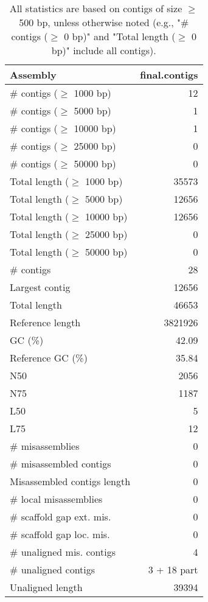 \documentclass[12pt,a4paper]{article}
\begin{document}
\begin{table}[ht]
\begin{center}
\caption{All statistics are based on contigs of size $\geq$ 500 bp, unless otherwise noted (e.g., "\# contigs ($\geq$ 0 bp)" and "Total length ($\geq$ 0 bp)" include all contigs).}
\begin{tabular}{|l*{1}{|r}|}
\hline
Assembly & final.contigs \\ \hline
\# contigs ($\geq$ 1000 bp) & 12 \\ \hline
\# contigs ($\geq$ 5000 bp) & 1 \\ \hline
\# contigs ($\geq$ 10000 bp) & 1 \\ \hline
\# contigs ($\geq$ 25000 bp) & 0 \\ \hline
\# contigs ($\geq$ 50000 bp) & 0 \\ \hline
Total length ($\geq$ 1000 bp) & 35573 \\ \hline
Total length ($\geq$ 5000 bp) & 12656 \\ \hline
Total length ($\geq$ 10000 bp) & 12656 \\ \hline
Total length ($\geq$ 25000 bp) & 0 \\ \hline
Total length ($\geq$ 50000 bp) & 0 \\ \hline
\# contigs & 28 \\ \hline
Largest contig & 12656 \\ \hline
Total length & 46653 \\ \hline
Reference length & 3821926 \\ \hline
GC (\%) & 42.09 \\ \hline
Reference GC (\%) & 35.84 \\ \hline
N50 & 2056 \\ \hline
N75 & 1187 \\ \hline
L50 & 5 \\ \hline
L75 & 12 \\ \hline
\# misassemblies & 0 \\ \hline
\# misassembled contigs & 0 \\ \hline
Misassembled contigs length & 0 \\ \hline
\# local misassemblies & 0 \\ \hline
\# scaffold gap ext. mis. & 0 \\ \hline
\# scaffold gap loc. mis. & 0 \\ \hline
\# unaligned mis. contigs & 4 \\ \hline
\# unaligned contigs & 3 + 18 part \\ \hline
Unaligned length & 39394 \\ \hline

\end{tabular}
\end{center}
\end{table}
\end{document}
